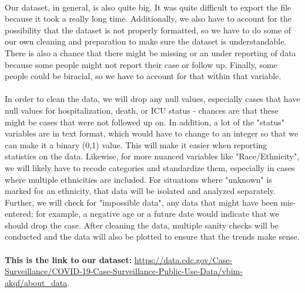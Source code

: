 \documentclass{article}
\begin{document}
\\
Our dataset, in general, is also quite big. It was quite difficult to export the file because it took a really long time. Additionally, we also have to account for the possibility that the dataset is not properly formatted, so we have to do some of our own cleaning and preparation to make sure the dataset is understandable. There is also a chance that there might be missing or an under reporting of data because some people might not report their case or follow up. Finally, some people could be biracial, so we have to account for that within that variable.\\
\\
In order to clean the data, we will drop any null values, especially cases that have null values for hospitalization, death, or ICU status - chances are that these might be cases that were not followed up on.  In addition, a lot of the "status" variables are in text format, which would have to change to an integer so that we can make it a binary (0,1) value. This will make it easier when reporting statistics on the data. Likewise, for more nuanced variables like "Race/Ethnicity", we will likely have to recode categories and standardize them, especially in cases where multiple ethnicities are included. For situations where "unknown" is marked for an ethnicity, that data will be isolated and analyzed separately. Further, we will check for "impossible data", any data that might have been mis-entered; for example, a negative age or a future date would indicate that we should drop the case. After cleaning the data, multiple sanity checks will be conducted and the data will also be plotted to ensure that the trends make sense.\\
\\
\textbf{This is the link to our dataset:}
\url{https://data.cdc.gov/Case-Surveillance/COVID-19-Case-Surveillance-Public-Use-Data/vbim-akqf/about\_data}.
\end{document}
